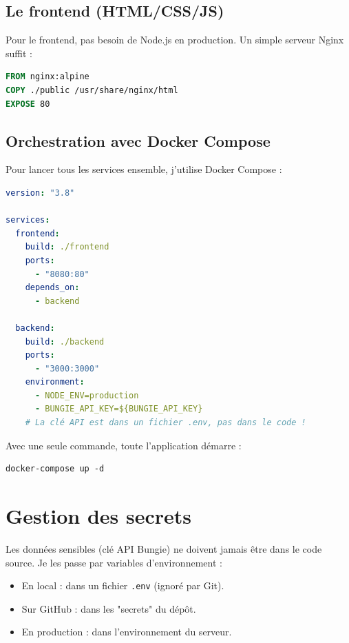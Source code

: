 \subsection{Le frontend (HTML/CSS/JS)}

Pour le frontend, pas besoin de Node.js en production. Un simple serveur Nginx suffit :

\begin{lstlisting}[language=dockerfile]
FROM nginx:alpine
COPY ./public /usr/share/nginx/html
EXPOSE 80
\end{lstlisting}

\subsection{Orchestration avec Docker Compose}

Pour lancer tous les services ensemble, j'utilise Docker Compose :

\begin{lstlisting}[language=yaml]
version: "3.8"

services:
  frontend:
    build: ./frontend
    ports:
      - "8080:80"
    depends_on:
      - backend

  backend:
    build: ./backend
    ports:
      - "3000:3000"
    environment:
      - NODE_ENV=production
      - BUNGIE_API_KEY=${BUNGIE_API_KEY}
    # La clé API est dans un fichier .env, pas dans le code !
\end{lstlisting}

Avec une seule commande, toute l'application démarre :

\begin{verbatim}
docker-compose up -d
\end{verbatim}

\section{Gestion des secrets}

Les données sensibles (clé API Bungie) ne doivent jamais être dans le code source. Je les passe par variables d'environnement :

\begin{itemize}
    \item En local : dans un fichier \texttt{.env} (ignoré par Git).
    \item Sur GitHub : dans les "secrets" du dépôt.
    \item En production : dans l'environnement du serveur.
\end{itemize}

